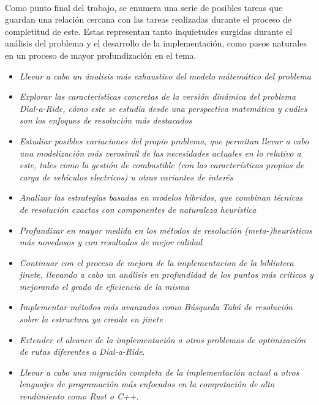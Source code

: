 \documentclass{subfiles}
\begin{document}
      \paragraph{}
      Como punto final del trabajo, se enumera una serie de posibles tareas que guardan una relación cercana con las tareas realizadas durante el proceso de completitud de este. Estas representan tanto inquietudes surgidas durante el análisis del problema y el desarrollo de la implementación, como pasos naturales en un proceso de mayor profundización en el tema.

      \begin{itemize}

        \item \emph{Llevar a cabo un ánalisis más exhaustivo del modelo mátemático del problema}

        \item \emph{Explorar las características concretas de la versión dinámica del problema Dial-a-Ride, cómo este se estudia desde una perspectiva matemática y cuáles son los enfoques de resolución más destacados}

        \item \emph{Estudiar posibles variaciones del propio problema, que permitan llevar a cabo una modelización más verosimil de las necesidades actuales en lo relativo a este, tales como la gestión de combustible (con las características propias de carga de vehículos electricos) u otras variantes de interés}

        \item \emph{Analizar las estrategias basadas en modelos híbridos, que combinan técnicas de resolución exactas con componentes de naturaleza heurística}

        \item \emph{Profundizar en mayor medida en los métodos de resolución (meta-)heurísticos más novedosos y con resultados de mejor calidad}

        \item \emph{Continuar con el proceso de mejora de la implementacion de la biblioteca \emph{jinete}, llevando a cabo un análisis en profundidad de los puntos más críticos y mejorando el grado de eficiencia de la misma}

        \item \emph{Implementar métodos más avanzados como \emph{Búsqueda Tabú} de resolución sobre la estructura ya creada en \emph{jinete}}

        \item \emph{Extender el alcance de la implementación a otros problemas de optimización de rutas diferentes a \emph{Dial-a-Ride}}.

        \item \emph{Llevar a cabo una migración completa de la implementación actual a otros lenguajes de programación más enfocados en la computación de alto rendimiento como \emph{Rust} o \emph{C++}}.

      \end{itemize}
\end{document}
